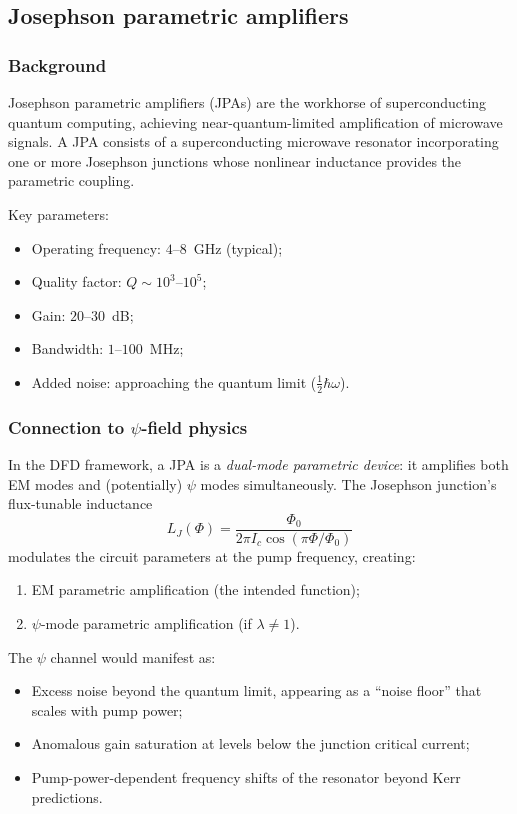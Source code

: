 \documentclass[12pt,aps,prd,twocolumn,superscriptaddress,nofootinbib]{revtex4-2}
\begin{document}
\subsection{Josephson parametric amplifiers}
\label{sec:JPA}

\subsubsection{Background}

Josephson parametric amplifiers (JPAs) are the workhorse of
superconducting quantum computing, achieving near-quantum-limited
amplification of microwave signals.  A JPA consists of a
superconducting microwave resonator incorporating one or more Josephson
junctions whose nonlinear inductance provides the parametric coupling.

Key parameters:
\begin{itemize}[noitemsep]
  \item Operating frequency: $4$--$8$~GHz (typical);
  \item Quality factor: $Q \sim 10^3$--$10^5$;
  \item Gain: $20$--$30$~dB;
  \item Bandwidth: $1$--$100$~MHz;
  \item Added noise: approaching the quantum limit
    ($\tfrac{1}{2}\hbar\omega$).
\end{itemize}

\subsubsection{Connection to $\psi$-field physics}

In the DFD framework, a JPA is a \emph{dual-mode parametric device}:
it amplifies both EM modes and (potentially) $\psi$ modes
simultaneously.  The Josephson junction's flux-tunable inductance
\begin{equation}
  L_J(\Phi) = \frac{\Phi_0}{2\pi I_c\cos(\pi\Phi/\Phi_0)}
  \label{eq:Josephson_L}
\end{equation}
modulates the circuit parameters at the pump frequency, creating:
\begin{enumerate}[noitemsep]
  \item EM parametric amplification (the intended function);
  \item $\psi$-mode parametric amplification (if $\lambda \neq 1$).
\end{enumerate}

The $\psi$ channel would manifest as:
\begin{itemize}[noitemsep]
  \item Excess noise beyond the quantum limit, appearing as a
    ``noise floor'' that scales with pump power;
  \item Anomalous gain saturation at levels below the junction
    critical current;
  \item Pump-power-dependent frequency shifts of the resonator
    beyond Kerr predictions.
\end{itemize}
\end{document}
